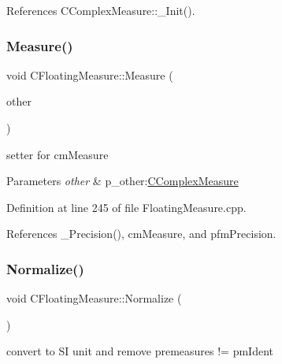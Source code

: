 References C\+Complex\+Measure\+::\+\_\+\+Init().

\mbox{\label{classCFloatingMeasure_af35c54ac06b1c8ddca86390360559548}} 
\subsubsection{\texorpdfstring{Measure()}{Measure()}\hspace{0.1cm}{\footnotesize\ttfamily [2/2]}}
{\footnotesize\ttfamily void C\+Floating\+Measure\+::\+Measure (\begin{DoxyParamCaption}\item[{const \hyperlink{classCComplexMeasure}{C\+Complex\+Measure} \&}]{other }\end{DoxyParamCaption})\hspace{0.3cm}{\ttfamily [protected]}}



setter for cm\+Measure 


\begin{DoxyParams}{Parameters}
{\em other} & p\+\_\+other\+:\hyperlink{classCComplexMeasure}{C\+Complex\+Measure} \\
\hline
\end{DoxyParams}


Definition at line 245 of file Floating\+Measure.\+cpp.



References \+\_\+\+Precision(), cm\+Measure, and pfm\+Precision.

\mbox{\label{classCFloatingMeasure_af4e2cc6a78b8e0cda11df432902bde8a}} 
\subsubsection{\texorpdfstring{Normalize()}{Normalize()}}
{\footnotesize\ttfamily void C\+Floating\+Measure\+::\+Normalize (\begin{DoxyParamCaption}{ }\end{DoxyParamCaption})}



convert to SI unit and remove premeasures != pm\+Ident 



